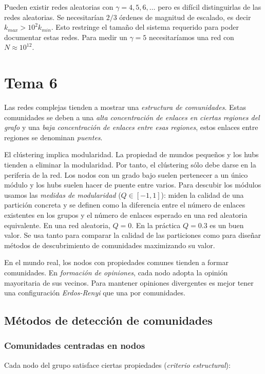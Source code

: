 \documentclass[10pt,spanish, landscape, twocolumn]{article}
\begin{document}
Pueden existir redes aleatorias con $\gamma = 4,5,6,\ldots$ pero es difícil distinguirlas de las redes aleatorias. Se necesitarían $2/3$ órdenes de magnitud de escalado, es decir $k_{max} > 10^2 k_{min}$. Esto restringe el tamaño del sistema requerido para poder documentar estas redes. Para medir un $\gamma = 5$ necesitaríamos una red con $N \approx 10^{12}$.

\newpage
\section{\textcolor{temaseis}{Tema 6}}
Las redes complejas tienden a mostrar una \textit{\textcolor{temaseis}{estructura de comunidades}}. Estas comunidades se deben a una \textit{\textcolor{temaseis}{alta concentración de enlaces en ciertas regiones del grafo}} y una \textit{\textcolor{temaseis}{baja concentración de enlaces entre esas regiones}}, estos enlaces entre regiones se denominan \textit{\textcolor{temaseis}{puentes}}.

El clústering implica modularidad. La propiedad de mundos pequeños y los hubs tienden a eliminar la modularidad. Por tanto, el clústering sólo debe darse en la periferia de la red. Los nodos con un grado bajo suelen pertenecer a un único módulo y los hubs suelen hacer de puente entre varios. Para descubir los módulos usamos las \textit{\textcolor{temaseis}{medidas de modularidad}} ($Q \in [-1,1]$): miden la calidad de una partición concreta y se definen como la diferencia entre el número de enlaces existentes en los grupos y el número de enlaces esperado en una red aleatoria equivalente. En una red aleatoria, $Q = 0$. En la práctica $Q = 0.3$ es un buen valor. Se usa tanto para comparar la calidad de las particiones como para diseñar métodos de descubrimiento de comunidades maximizando su valor.

En el mundo real, los nodos con propiedades comunes tienden a formar comunidades. En \textit{\textcolor{temaseis}{formación de opiniones}}, cada nodo adopta la opinión mayoritaria de sus vecinos. Para mantener opiniones divergentes es mejor tener una configuración \textit{\textcolor{temaseis}{Erdos-Renyi}} que una por comunidades.

\subsection{\textcolor{temaseis}Métodos de detección de comunidades}
\subsubsection{\textcolor{temaseis}Comunidades centradas en nodos}
Cada nodo del grupo satisface ciertas propiedades (\textit{\textcolor{temaseis}{criterio estructural}}):
\end{document}
